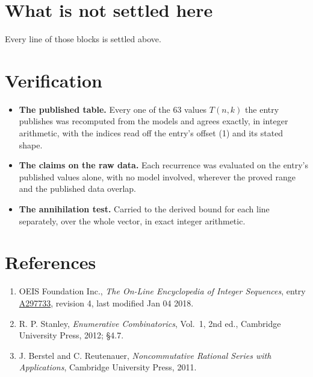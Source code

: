 \documentclass[11pt]{article}
\theoremstyle{definition}
\begin{document}
\section{What is not settled here}

Every line of those blocks is settled above.

\section{Verification}

\begin{itemize}

\item {\bfseries The published table.} Every one of the 63 values $T(n,k)$ the entry publishes was recomputed from the models and agrees exactly, in integer arithmetic, with the indices read off the entry's offset (1) and its stated shape.

\item {\bfseries The claims on the raw data.} Each recurrence was evaluated on the entry's published values alone, with no model involved, wherever the proved range and the published data overlap.

\item {\bfseries The annihilation test.} Carried to the derived bound for each line separately, over the whole vector, in exact integer arithmetic.

\end{itemize}

\section{References}

\begin{enumerate}

\item OEIS Foundation Inc., \emph{The On-Line Encyclopedia of Integer Sequences}, entry \href{https://oeis.org/A297733}{A297733}, revision 4, last modified Jan 04 2018.

\item R. P. Stanley, \emph{Enumerative Combinatorics}, Vol.~1, 2nd ed., Cambridge University Press, 2012; \S4.7.

\item J. Berstel and C. Reutenauer, \emph{Noncommutative Rational Series with Applications}, Cambridge University Press, 2011.

\end{enumerate}
\end{document}
